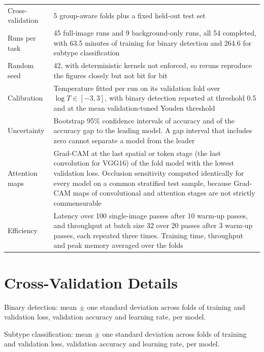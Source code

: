 \documentclass[a4paper,fleqn]{cas-sc}
\begin{document}
\begin{heretable}
\begin{tabularx}{\textwidth}{@{}lY@{}}
Cross-validation & 5 group-aware folds plus a fixed held-out test set \\
Runs per task & 45 full-image runs and 9 background-only runs, all 54 completed, with 63.5 minutes of training for binary detection and 264.6 for subtype classification \\
Random seed & 42, with deterministic kernels not enforced, so reruns reproduce the figures closely but not bit for bit \\
Calibration & Temperature fitted per run on its validation fold over $\log T\in[-3, 3]$, with binary detection reported at threshold 0.5 and at the mean validation-tuned Youden threshold \\
Uncertainty & Bootstrap 95\% confidence intervals of accuracy and of the accuracy gap to the leading model. A gap interval that includes zero cannot separate a model from the leader \\
Attention maps & Grad-CAM at the last spatial or token stage (the last convolution for VGG16) of the fold model with the lowest validation loss. Occlusion sensitivity computed identically for every model on a common stratified test sample, because Grad-CAM maps of convolutional and attention stages are not strictly commensurable \\
Efficiency & Latency over 100 single-image passes after 10 warm-up passes, and throughput at batch size 32 over 20 passes after 3 warm-up passes, each repeated three times. Training time, throughput and peak memory averaged over the folds \\
\bottomrule
\end{tabularx}
\end{heretable}

\section{Cross-Validation Details}
\label{sec:supp-cv}

\begin{herefigure}
\centering
{}
\caption{Binary detection: mean $\pm$ one standard deviation across folds of training and validation loss, validation accuracy and learning rate, per model.}
\label{fig:curves-binary}
\end{herefigure}

\begin{herefigure}
\centering
{}
\caption{Subtype classification: mean $\pm$ one standard deviation across folds of training and validation loss, validation accuracy and learning rate, per model.}
\label{fig:curves-multiclass}
\end{herefigure}
\end{document}
